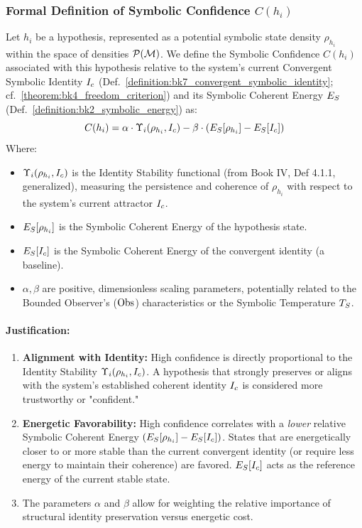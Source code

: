 \subsubsection{Formal Definition of Symbolic Confidence \(C(h_i)\)}
\label{subsubsec:bk7_formal_definition_of_symbolic_confidence_ch_i}
Let \(h_i\) be a hypothesis, represented as a potential symbolic state density \(\rho_{h_i}\) within the space of densities \(\mathcal{P}(\mathcal{M})\). We define the Symbolic Confidence \(C(h_i)\) associated with this hypothesis relative to the system's current Convergent Symbolic Identity \(I_c\) (Def.~\ref{definition:bk7_convergent_symbolic_identity}; cf.~\ref{theorem:bk4_freedom_criterion}) and its Symbolic Coherent Energy \(E_S\) (Def.~\ref{definition:bk2_symbolic_energy}) as:
\begin{equation}
C(h_i) = \alpha \cdot \Upsilon_i(\rho_{h_i}, I_c) - \beta \cdot (E_S[\rho_{h_i}] - E_S[I_c])
\label{eq:bk7_symbolic_confidence}
\end{equation}
Where:
\begin{itemize}
    \item \(\Upsilon_i(\rho_{h_i}, I_c)\) is the Identity Stability functional (from Book IV, Def 4.1.1, generalized), measuring the persistence and coherence of \(\rho_{h_i}\) with respect to the system's current attractor \(I_c\).
    \item \(E_S[\rho_{h_i}]\) is the Symbolic Coherent Energy of the hypothesis state.
    \item \(E_S[I_c]\) is the Symbolic Coherent Energy of the convergent identity (a baseline).
    \item \(\alpha, \beta\) are positive, dimensionless scaling parameters, potentially related to the Bounded Observer's ($\mathrm{Obs}$) characteristics or the Symbolic Temperature \(T_S\).
\end{itemize}
\paragraph{Justification:}
\begin{enumerate}
    \item \textbf{Alignment with Identity:} High confidence is directly proportional to the Identity Stability \(\Upsilon_i(\rho_{h_i}, I_c)\). A hypothesis that strongly preserves or aligns with the system's established coherent identity \(I_c\) is considered more trustworthy or "confident."
    \item \textbf{Energetic Favorability:} High confidence correlates with a \textit{lower} relative Symbolic Coherent Energy \((E_S[\rho_{h_i}] - E_S[I_c])\). States that are energetically closer to or more stable than the current convergent identity (or require less energy to maintain their coherence) are favored. \(E_S[I_c]\) acts as the reference energy of the current stable state.
    \item The parameters \(\alpha\) and \(\beta\) allow for weighting the relative importance of structural identity preservation versus energetic cost.
\end{enumerate}
